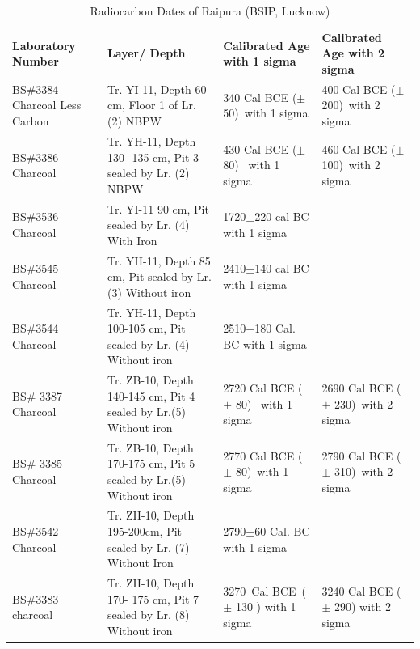 {{\setlength\tabcolsep{2pt}
{\fontsize{7}{9}\selectfont
\begin{longtable}{|p{1.8cm}|p{2.5cm}|p{2cm}|p{2.5cm}|}
\captionsetup{font=footnotesize}
\caption{Radiocarbon Dates of Raipura (BSIP, Lucknow)} \label{table III.9}\\
\hline
\multicolumn{1}{|m{1.8cm}|}{\centering \textbf{Laboratory Number}} &
\multicolumn{1}{m{2.5cm}|}{\centering \textbf{Layer/ Depth}} & 
\multicolumn{1}{m{2cm}|}{\centering \textbf{Calibrated Age with 1 sigma}} & 
\multicolumn{1}{m{2.5cm}|}{\centering \textbf{Calibrated Age with 2 sigma}}\\
\endfirsthead
\hline
\endhead
\hline
\endfoot
\hline
BS\#3384 Charcoal Less Carbon\footnotemark & Tr. YI-11, Depth 60 cm, Floor 1 of Lr. (2) NBPW & 340 Cal BCE ($\pm$ 50) with 1 sigma & 400 Cal BCE ($\pm$ 200) with 2 sigma\\
BS\#3386 Charcoal &  Tr. YH-11, Depth 130- 135 cm, Pit 3 sealed by Lr. (2) NBPW & 430 Cal BCE ($\pm$ 80)  with 1 sigma & 460 Cal BCE ($\pm$ 100) with 2 sigma \\
BS\#3536 Charcoal & Tr. YI-11 90 cm, Pit sealed by Lr. (4) With Iron & 1720$\pm$220 cal BC with 1 sigma & \\
BS\#3545 Charcoal & Tr. YH-11, Depth 85 cm, Pit sealed by Lr. (3) Without iron & 2410$\pm$140 cal BC with 1 sigma & \\
BS\#3544 Charcoal &  Tr. YH-11, Depth 100-105 cm, Pit sealed by Lr. (4) Without iron & 2510$\pm$180 Cal. BC with 1 sigma & \\
BS\# 3387 Charcoal & Tr. ZB-10, Depth 140-145 cm, Pit 4 sealed by Lr.(5) Without iron & 2720 Cal BCE ($\pm$ 80)  with 1 sigma & 2690 Cal BCE ($\pm$ 230) with 2 sigma\\
BS\# 3385 Charcoal  & Tr. ZB-10, Depth 170-175 cm, Pit 5 sealed by Lr.(5) Without iron & 2770 Cal BCE ($\pm$ 80) with 1 sigma & 2790 Cal BCE ($\pm$ 310) with 2 sigma\\
BS\#3542 Charcoal & Tr. ZH-10, Depth 195-200cm, Pit sealed by Lr. (7) Without Iron & 2790$\pm$60 Cal. BC with 1 sigma & \\
BS\#3383 charcoal & Tr. ZH-10, Depth 170- 175 cm, Pit 7 sealed by Lr. (8) Without iron & 3270 Cal BCE ($\pm$ 130 ) with 1 sigma & 3240 Cal BCE ($\pm$ 290) with 2 sigma
\end{longtable}
}}

}
